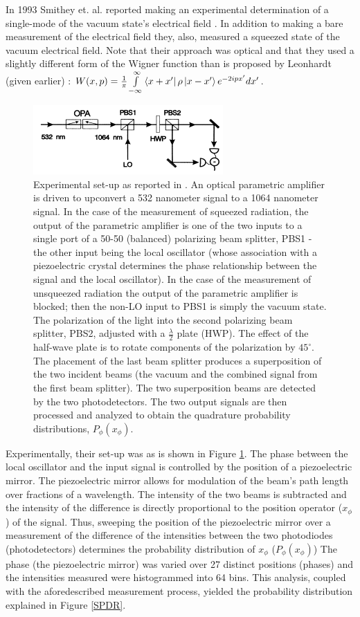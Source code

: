 In 1993 Smithey et. al. reported making an experimental determination of a single-mode of the vacuum state's electrical field \cite{Smithey}. In addition to making a bare measurement of the electrical field they, also, measured a squeezed state of the vacuum electrical field. Note that their approach was optical and that they used a slightly different form of the Wigner function than is proposed by Leonhardt (given earlier) : $W(x,p)=\frac{1}{\pi}\int\limits_{-\infty}^{\infty}\bra{x+x'}\rho\ket{x-x'}e^{-2ipx'}dx'$.

\begin{figure}%
\includegraphics[width=274px,height=100px]{Figures/SmitheySetup.png}%
\caption{Experimental set-up as reported in \cite{Smithey}. An optical parametric amplifier is driven to upconvert a 532 nanometer signal to a 1064 nanometer signal. In the case of the measurement of squeezed radiation, the output of the parametric amplifier is one of the two inputs to a single port of a 50-50 (balanced) polarizing beam splitter, PBS1 - the other input being the local oscillator (whose association with a piezoelectric crystal determines the phase relationship between the signal and the local oscillator). In the case of the measurement of unsqueezed radiation the output of the parametric amplifier is blocked; then the non-LO input to PBS1 is simply the vacuum state. The polarization of the light into the second polarizing beam splitter, PBS2, adjusted with a $\frac{\lambda}{2}$ plate (HWP).  The effect of the half-wave plate is to rotate components of the polarization by $45^\circ$. The placement of the last beam splitter produces a superposition of the two incident beams (the vacuum and the combined signal from the first beam splitter). The two superposition beams are detected by the two photodetectors. The two output signals are then processed and analyzed to obtain the quadrature probability distributions, $P_\phi(x_\phi)$.}
\label{SmitheySetup}%
\end{figure}

Experimentally, their set-up was as is shown in Figure \ref{SmitheySetup}. The phase between the local oscillator and the input signal is controlled by the position of a piezoelectric mirror. The piezoelectric mirror allows for modulation of the beam's path length over fractions of a wavelength. The intensity of the two beams is subtracted and the intensity of the difference is directly proportional to the position operator ($x_\phi$) of the signal. Thus, sweeping the position of the piezoelectric mirror over a measurement of the difference of the intensities between the two photodiodes (photodetectors) determines the probability distribution of $x_\phi$ ($P_\phi(x_\phi)$) The phase (the piezoelectric mirror) was varied over 27 distinct positions (phases) and the intensities measured were histogrammed into 64 bins. This analysis, coupled with the aforedescribed measurement process, yielded the probability distribution explained in Figure \ref{SPDR}.

